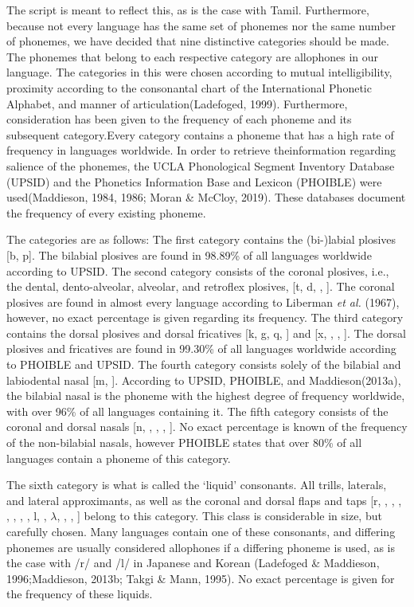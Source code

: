 The script is meant to reflect this, as is the case with Tamil. Furthermore, because not every language has the same set of phonemes nor the same number of phonemes, we have decided that nine distinctive categories should be made. The phonemes that belong to each respective category are allophones in our language. The categories in this were chosen according to mutual intelligibility, proximity according to the consonantal chart of the International Phonetic Alphabet, and manner of articulation(Ladefoged, 1999). Furthermore, consideration has been given to the frequency of each phoneme and its subsequent category.Every category contains a phoneme that has a high rate of frequency in languages worldwide. In order to retrieve theinformation regarding salience of the phonemes, the UCLA Phonological Segment Inventory Database (UPSID) and the Phonetics Information Base and Lexicon (PHOIBLE) were used(Maddieson, 1984, 1986; Moran \& McCloy, 2019). These databases document the frequency of every existing phoneme. 

The categories are as follows: The first category contains the (bi-)labial plosives [b, p]. The bilabial plosives are found in 98.89\% of all languages worldwide according to UPSID. The second category consists of the coronal plosives, i.e., the dental, dento-alveolar, alveolar, and retroflex plosives, [t, d, \textrtailt, \textrtaild]. The coronal plosives are found in almost every language according to Liberman \textit{et al.} (1967), however, no exact percentage is given regarding its frequency. The third category contains the dorsal plosives and dorsal fricatives [k, g, q, \textscg] and [x, \textgamma, \textchi, \textinvscr]. The dorsal plosives and fricatives are found in 99.30\% of all languages worldwide according to PHOIBLE and UPSID. The fourth category consists solely of the bilabial and labiodental nasal [m, \textltailm]. According to UPSID, PHOIBLE, and Maddieson(2013a), the bilabial nasal is the phoneme with the highest degree of frequency worldwide, with over 96\% of all languages containing it. The fifth category consists of the coronal and dorsal nasals [n, \textrtailn ,  \textltailn, \ng, \textscn]. No exact percentage is known of the frequency of the non-bilabial nasals, however PHOIBLE states that over 80\% of all languages contain a phoneme of this category. 

The sixth category is what is called the ‘liquid’ consonants. All trills, laterals, and lateral approximants, as well as the coronal and dorsal flaps and taps [r, \textscr , \textfishhookr, \textrtailr, \textbeltl, \textlyoghlig, \textturnr, \textturnrrtail, l, \textrtaill, $\lambda$, \textscl, \textturnmrleg,  \textturnlonglegr] belong to this category. This class is considerable in size, but carefully chosen. Many languages contain one of these consonants, and differing phonemes are usually considered allophones if a differing phoneme is used, as is the case with /r/ and /l/ in Japanese and Korean (Ladefoged \& Maddieson, 1996;Maddieson, 2013b; Takgi \& Mann, 1995). No exact percentage is given for the frequency of these liquids. 


